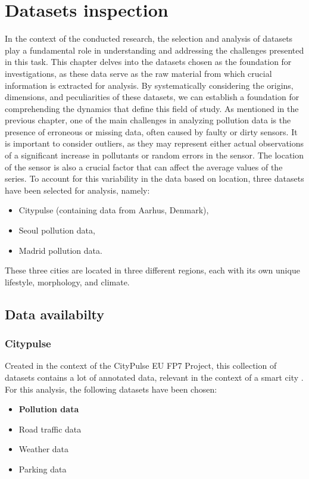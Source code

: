 \chapter{Datasets inspection}
\label{chap:Datasets}

In the context of the conducted research, the selection and analysis of datasets play a fundamental role in understanding and addressing the challenges presented in this task. This chapter delves into the datasets chosen as the foundation for investigations, as these data serve as the raw material from which crucial information is extracted for analysis. By systematically considering the origins, dimensions, and peculiarities of these datasets, we can establish a foundation for comprehending the dynamics that define this field of study.
As mentioned in the previous chapter, one of the main challenges in analyzing pollution data is the presence of erroneous or missing data, often caused by faulty or dirty sensors. 
It is important to consider outliers, as they may represent either actual observations of a significant increase in pollutants or random errors in the sensor. The location of the sensor is also a crucial factor that can affect the average values of the series. 
To account for this variability in the data based on location, three datasets have been selected for analysis, namely:
\begin{itemize}
    \item Citypulse (containing data from Aarhus, Denmark),
    \item Seoul pollution data,
    \item Madrid pollution data.
\end{itemize}

These three cities are located in three different regions, each with its own unique lifestyle, morphology, and climate.

\section{Data availabilty}
\subsection{Citypulse}
Created in the context of the CityPulse EU FP7 Project, this collection of datasets contains a lot of annotated data, relevant in the context of a smart city \cite{CityPulseDataset}. For this analysis, the following datasets have been chosen:
\begin{itemize}
    \item \textbf{Pollution data}
    \item Road traffic data
    \item Weather data
    \item Parking data
\end{itemize}

